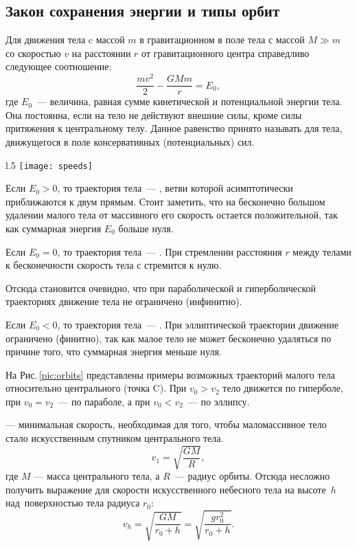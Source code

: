 \subsection{Закон сохранения энергии и типы орбит}
Для движения тела c массой $m$ в гравитационном  в поле тела 
с массой \linebreak $M\gg m$ со скоростью $v$ на расстоянии $r$ от 
гравитационного центра справедливо следующее соотношение: 
\begin{equation}
\frac{m v^2}{2}-\frac{GM m }{r}=E_0,
\end{equation}
где $E_0$~--- величина, равная сумме кинетической и потенциальной энергии тела. Она постоянна, если на тело не действуют внешние силы, кроме силы притяжения к центральному телу. Данное равенство принято называть  для тела, движущегося в поле консервативных (потенциальных) сил.

\begin{wrapfigure}[10]{l}{.5\tw}
	\centering
	\vspace{-1pc}
	\texttt{[image: speeds]}
	\caption{Возможные траектории тела \label{pic:orbits}}
\end{wrapfigure}
Если $E_0>0$, то траектория тела~--- , 
ветви которой асимптотически приближаются к двум прямым. Стоит заметить,
что на бесконечно большом удалении малого \linebreak тела от массивного
его скорость остается положительной, так как суммарная энергия $E_0$ 
больше нуля. 

Если $E_0=0$, то траектория тела~--- . При стремлении
расстояния $r$ между телами к бесконечности скорость тела с стремится к нулю. 

Отсюда становится очевидно, что при параболической и гиперболической
 траекториях движение тела не ограничено (инфинитно).

Если $E_0<0$, то траектория тела~--- . При 
эллиптической траектории движение ограничено (финитно), так как малое тело
не может бесконечно удаляться по причине того,
что суммарная энергия меньше нуля.

На Рис.\,\ref{pic:orbits} представлены примеры возможных траекторий малого тела 
относительно центрального (точка C). При $v_0 > v_{2}$ тело движется 
по гиперболе, при $v_0 = v_{2}$~--- по параболе, 
а при $v_0 < v_{2}$~--- по эллипсу.

 --- минимальная скорость, необходимая для 
того, чтобы маломассивное тело стало искусственным спутником центрального тела.
\begin{equation}v_1=\sqrt{\frac{GM}{R}},
\end{equation}
где $M$ --- масса центрального тела, а $R$~--- радиус орбиты. Отсюда несложно получить выражение для
скорости искусственного небесного тела на высоте~$h$ над~поверхностью тела радиуса $r_0$:
\begin{equation}
v_h=\sqrt{\frac{GM}{r_0+h}}=\sqrt{\frac{g r_0^2}{r_0+h}}.
\end{equation}

